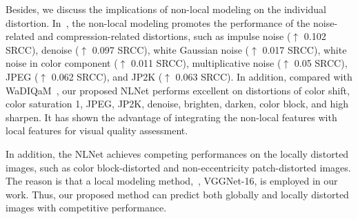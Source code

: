 	Besides, we discuss the implications of non-local modeling on the individual distortion. In~, the non-local modeling promotes the performance of the noise-related and compression-related distortions, such as impulse noise ($\uparrow$ 0.102 SRCC), denoise ($\uparrow$ 0.097 SRCC), white Gaussian noise ($\uparrow$ 0.017 SRCC), white noise in color component ($\uparrow$ 0.011 SRCC), multiplicative noise ($\uparrow$ 0.05 SRCC), JPEG ($\uparrow$ 0.062 SRCC), and JP2K ($\uparrow$ 0.063 SRCC). In addition, compared with WaDIQaM~\citep{bosse2017deep}, our proposed NLNet performs excellent on distortions of color shift, color saturation 1, JPEG, JP2K, denoise, brighten, darken, color block, and high sharpen. It has shown the advantage of integrating the non-local features with local features for visual quality assessment.
	
	In addition, the NLNet achieves competing performances on the locally distorted images, such as color block-distorted and non-eccentricity patch-distorted images. The reason is that a local modeling method,~\ie, VGGNet-16, is employed in our work. Thus, our proposed method can predict both globally and locally distorted images with competitive performance.
	
